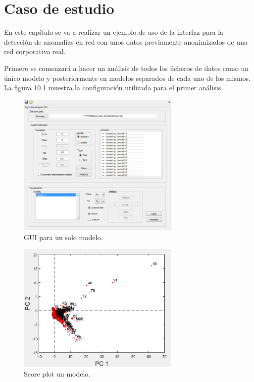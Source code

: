 \chapter{Caso de estudio}

En este capítulo se va a realizar un ejemplo de uso de la interfaz para la detección de anomalías en red con unos datos previamente anonimizados de una red corporativa real.

\bigskip

Primero se comenzará a hacer un análisis de todos los ficheros de datos como un único modelo y posteriormente en modelos separados de cada uno de los mismos. La figura 10.1 muestra la configuración utilizada para el primer análisis.

\bigskip

\begin{figure}[H]
\centering
\includegraphics[width=0.7\textwidth]{imagenes/casoEstudio/10_1.png}
\caption{GUI para un solo modelo.}
\end{figure}

\begin{figure}[!ht]
\centering
\includegraphics[width=0.7\textwidth]{imagenes/casoEstudio/10_2.png}
\caption{Score plot un modelo.}
\end{figure}

